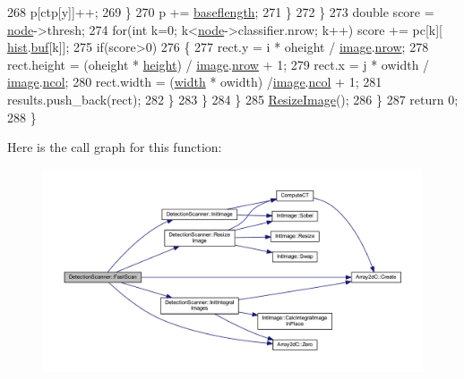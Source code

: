 \begin{DoxyCode}
268                                 p[ctp[y]]++;
269                         \}
270                         p += \mbox{\hyperlink{class_detection_scanner_aee5791fae7267a2f4a56e429d8842e6e}{baseflength}};
271                     \}
272                 \}
273                 \textcolor{keywordtype}{double} score = \mbox{\hyperlink{classnode}{node}}->thresh;
274                 \textcolor{keywordflow}{for}(\textcolor{keywordtype}{int} k=0; k<\mbox{\hyperlink{classnode}{node}}->classifier.nrow; k++) score += pc[k][
      \mbox{\hyperlink{class_detection_scanner_a3e46cb7413cad57d65fe4c35f959ea11}{hist}}.\mbox{\hyperlink{class_array2d_c_a25d8fa5049d4c7ded126e0acdd18f37a}{buf}}[k]];
275                 \textcolor{keywordflow}{if}(score>0)
276                 \{
277                     rect.y = i * oheight / \mbox{\hyperlink{class_detection_scanner_aa4e4cfa6cc0a2ffd044c6cd9721a6b59}{image}}.\mbox{\hyperlink{class_array2d_c_a12f690f7195f7674a86a7e1eedbc473c}{nrow}};
278                     rect.height = (oheight * \mbox{\hyperlink{class_detection_scanner_a0526f032d5e7efd9fced2592ad5c8d03}{height}}) / \mbox{\hyperlink{class_detection_scanner_aa4e4cfa6cc0a2ffd044c6cd9721a6b59}{image}}.\mbox{\hyperlink{class_array2d_c_a12f690f7195f7674a86a7e1eedbc473c}{nrow}} + 1;
279                     rect.x = j * owidth / \mbox{\hyperlink{class_detection_scanner_aa4e4cfa6cc0a2ffd044c6cd9721a6b59}{image}}.\mbox{\hyperlink{class_array2d_c_a27e0f8f40f644831cd7c750db59dc28a}{ncol}};
280                     rect.width = (\mbox{\hyperlink{class_detection_scanner_a37d12c13060640ad0321f089cd565476}{width}} * owidth) /\mbox{\hyperlink{class_detection_scanner_aa4e4cfa6cc0a2ffd044c6cd9721a6b59}{image}}.\mbox{\hyperlink{class_array2d_c_a27e0f8f40f644831cd7c750db59dc28a}{ncol}} + 1;
281                     results.push\_back(rect);
282                 \}
283             \}
284         \}
285         \mbox{\hyperlink{class_detection_scanner_a01790349ec7aef4ff03335d5e76f183a}{ResizeImage}}();
286     \}
287     \textcolor{keywordflow}{return} 0;
288 \}
\end{DoxyCode}
Here is the call graph for this function\+:\nopagebreak
\begin{figure}[H]
\begin{center}
\leavevmode
\includegraphics[width=350pt]{class_detection_scanner_aa27d494b253975922d853070aab7ce4d_cgraph}
\end{center}
\end{figure}
